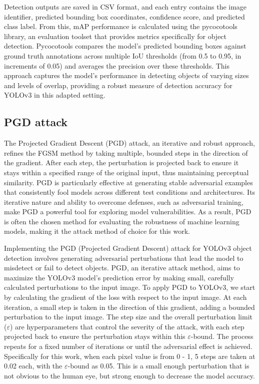 \documentclass[journal,onecolumn,12pt]{IEEEtran}
\begin{document}
Detection outputs are saved in CSV format, and each entry contains the image identifier, predicted bounding box coordinates, confidence score, and predicted class label. From this, mAP performance is calculated using the pycocotools library, an evaluation toolset that provides metrics specifically for object detection. Pycocotools compares the model’s predicted bounding boxes against ground truth annotations across multiple IoU thresholds (from 0.5 to 0.95, in increments of 0.05) and averages the precision over these thresholds. This approach captures the model’s performance in detecting objects of varying sizes and levels of overlap, providing a robust measure of detection accuracy for YOLOv3 in this adapted setting.

\subsection{PGD attack}
The Projected Gradient Descent (PGD) attack, an iterative and robust approach, refines the FGSM method by taking multiple, bounded steps in the direction of the gradient. After each step, the perturbation is projected back to ensure it stays within a specified range of the original input, thus maintaining perceptual similarity. PGD is particularly effective at generating stable adversarial examples that consistently fool models across different test conditions and architectures. Its iterative nature and ability to overcome defenses, such as adversarial training, make PGD a powerful tool for exploring model vulnerabilities. As a result, PGD is often the chosen method for evaluating the robustness of machine learning models, making it the attack method of choice for this work.

Implementing the PGD (Projected Gradient Descent) attack for YOLOv3 object detection involves generating adversarial perturbations that lead the model to misdetect or fail to detect objects. PGD, an iterative attack method, aims to maximize the YOLOv3 model’s prediction error by making small, carefully calculated perturbations to the input image. To apply PGD to YOLOv3, we start by calculating the gradient of the loss with respect to the input image. At each iteration, a small step is taken in the direction of this gradient, adding a bounded perturbation to the input image. The step size and the overall perturbation limit ($\varepsilon$) are hyperparameters that control the severity of the attack, with each step projected back to ensure the perturbation stays within this $\varepsilon$-bound. The process repeats for a fixed number of iterations or until the adversarial effect is achieved. Specifically for this work, when each pixel value is from 0 - 1, 5 steps are taken at 0.02 each, with the $\varepsilon$-bound as 0.05. This is a small enough perturbation that is not obvious to the human eye, but strong enough to decrease the model accuracy.
\end{document}
